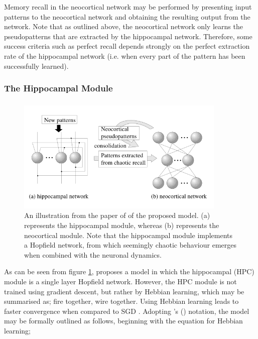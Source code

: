 Memory recall in the neocortical network may be performed by presenting input patterns to the neocortical network and obtaining the resulting output from the network. Note that as outlined above, the neocortical network only learns the pseudopatterns that are extracted by the hippocampal network. Therefore, some success criteria such as perfect recall depends strongly on the perfect extraction rate of the hippocampal network (i.e. when every part of the pattern has been successfully learned).

\subsubsection{The Hippocampal Module}
\subsubsection{\cite{Hattori2010}}
\begin{figure}
\centering
\includegraphics[width=10cm]{fig/hattori2010_model_structure}
\caption{An illustration from the paper of \cite{Hattori2010} of the proposed model. (a) represents the hippocampal module, whereas (b) represents the neocortical module. Note that the hippocampal module implements a Hopfield network, from which seemingly chaotic behaviour emerges when combined with the neuronal dynamics.}
\label{fig:hattori2010_model_structure}
\end{figure}

As can be seen from figure \ref{fig:hattori2010_model_structure}, \cite{Hattori2010} proposes a model in which the hippocampal (HPC) module is a single layer Hopfield network. However, the HPC module is not trained using gradient descent, but rather by Hebbian learning, which may be summarised as; fire together, wire together. Using Hebbian learning leads to faster convergence when compared to SGD \citep{Hattori2010}. Adopting \citeauthor{Hattori2010}'s (\citeyear{Hattori2010}) notation, the model may be formally outlined as follows, beginning with the equation for Hebbian learning;

